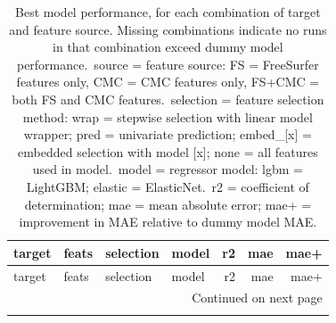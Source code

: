 \documentclass{article}
\begin{document}
	\begin{longtable}{llllrrr}
		\caption{Best model performance, for each combination of target and feature source. Missing combinations indicate no runs in that combination exceed dummy model performance.\ source = feature source: FS = FreeSurfer features only, CMC = CMC features only, FS+CMC = both FS and CMC features.\ selection = feature selection method: wrap = stepwise selection with linear model wrapper; pred = univariate prediction; embed\_[x] = embedded selection with model [x]; none = all features used in model.\ model = regressor model: lgbm = LightGBM; elastic = ElasticNet.\ r2 = coefficient of determination; mae = mean absolute error; mae+ = improvement in MAE relative to dummy model MAE.} \label{tab:cmc-target-feat-best} \\
		\toprule
		target & feats & selection & model & r2 & mae & mae+ \\
		\midrule
		\endfirsthead
		\toprule
		target & feats & selection & model & r2 & mae & mae+ \\
		\midrule
		\endhead
		\midrule
		\multicolumn{7}{r}{Continued on next page} \\
		\midrule
		\endfoot
		\bottomrule

\end{longtable}
\end{document}
